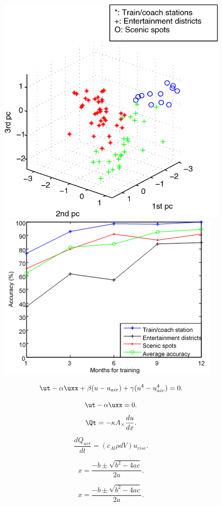 \documentclass[a4paper, 10pt, conference]{ieeeconf}      %
\begin{document}
\begin{figure}[htbp]
    \centering
    \includegraphics{fig/f6.png}
    \includegraphics{fig/f7.png}
    \caption{}
    \label{fig:my_label}
\end{figure}

\begin{equation}
\label{eq:one}
\ut - \alpha \uxx + \beta (u-u_{air}) + \gamma (u^4 - u_{air}^4)  = 0.
\end{equation} 

\begin{equation}
\label{eq:two}
\ut - \alpha\uxx = 0.
\end{equation}
\begin{equation}
\label{eq:three}
\Qt = -\kappa A_{\times}\frac{du}{dx}.
\end{equation}

\begin{equation}
\label{eq:four}
\frac{dQ_{net}}{dt} = (c_{Al}\rho dV) u_{rise}.
\end{equation}


\begin{equation}
    x=\frac{-b\pm\sqrt{b^2-4ac}}{2a}.
    \label{eq:quadratic}
\end{equation}

$$    x=\frac{-b\pm\sqrt{b^2-4ac}}{2a}.
    \label{eq:quadratic}
$$
\end{document}
